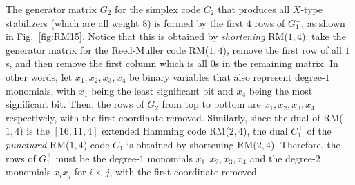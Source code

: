 \documentclass[twoside,romanappendices]{IEEEtran}
\begin{document}
The generator matrix $G_2$ for the simplex code $C_2$ that produces all $X$-type stabilizers (which are all weight $8$) is formed by the first $4$ rows of $G_1^{\perp}$, as shown in Fig.~\ref{fig:RM15}.
\setcounter{MaxMatrixCols}{20}
Notice that this is obtained by \emph{shortening} RM($1,4$): take the generator matrix for the Reed-Muller code RM($1,4$), remove the first row of all $1$s, and then remove the first column which is all $0$s in the remaining matrix.
In other words, let $x_1,x_2,x_3,x_4$ be binary variables that also represent degree-$1$ monomials, with $x_1$ being the least significant bit and $x_4$ being the most significant bit.
Then, the rows of $G_2$ from top to bottom are $x_1,x_2,x_3,x_4$ respectively, with the first coordinate removed.
Similarly, since the dual of RM($1,4$) is the $[16,11,4]$ extended Hamming code RM($2,4$), the dual $C_1^{\perp}$ of the \emph{punctured} RM($1,4$) code $C_1$ is obtained by shortening RM($2,4$).
Therefore, the rows of $G_1^{\perp}$ must be the degree-$1$ monomials $x_1,x_2,x_3,x_4$ and the degree-$2$ monomials $x_i x_j$ for $i < j$, with the first coordinate removed.
\end{document}
